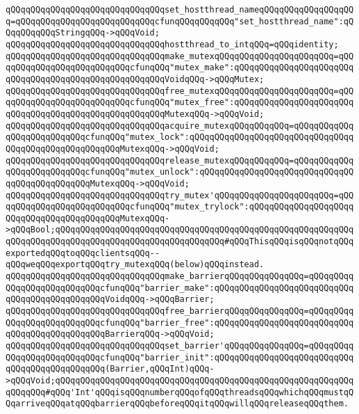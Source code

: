 \verb|qQQqqQQqqQQqqQQqqQQqqQQqqQQqqQQqset_hostthread_nameqQQqqQQqqQQqqQQqqQQq=qQQqqQQqqQQqqQQqqQQqqQQqqQQqcfunqQQqqQQqqQQq"set_hostthread_name":qQQqqQQqqQQqStringqQQq->qQQqVoid;|\newline
\newline
\verb|qQQqqQQqqQQqqQQqqQQqqQQqqQQqqQQqhostthread_to_intqQQq=qQQqidentity;|\newline
\newline
\verb|qQQqqQQqqQQqqQQqqQQqqQQqqQQqqQQqmake_mutexqQQqqQQqqQQqqQQqqQQqqQQq=qQQqqQQqqQQqqQQqqQQqqQQqqQQqcfunqQQq"mutex_make":qQQqqQQqqQQqqQQqqQQqqQQqqQQqqQQqqQQqqQQqqQQqqQQqqQQqqQQqVoidqQQq->qQQqMutex;|\newline
\verb|qQQqqQQqqQQqqQQqqQQqqQQqqQQqqQQqfree_mutexqQQqqQQqqQQqqQQqqQQqqQQq=qQQqqQQqqQQqqQQqqQQqqQQqqQQqcfunqQQq"mutex_free":qQQqqQQqqQQqqQQqqQQqqQQqqQQqqQQqqQQqqQQqqQQqqQQqqQQqqQQqMutexqQQq->qQQqVoid;|\newline
\verb|qQQqqQQqqQQqqQQqqQQqqQQqqQQqqQQqacquire_mutexqQQqqQQqqQQq=qQQqqQQqqQQqqQQqqQQqqQQqqQQqcfunqQQq"mutex_lock":qQQqqQQqqQQqqQQqqQQqqQQqqQQqqQQqqQQqqQQqqQQqqQQqqQQqqQQqMutexqQQq->qQQqVoid;|\newline
\verb|qQQqqQQqqQQqqQQqqQQqqQQqqQQqqQQqrelease_mutexqQQqqQQqqQQq=qQQqqQQqqQQqqQQqqQQqqQQqqQQqcfunqQQq"mutex_unlock":qQQqqQQqqQQqqQQqqQQqqQQqqQQqqQQqqQQqqQQqqQQqqQQqMutexqQQq->qQQqVoid;|\newline
\verb|qQQqqQQqqQQqqQQqqQQqqQQqqQQqqQQqtry_mutex'qQQqqQQqqQQqqQQqqQQqqQQq=qQQqqQQqqQQqqQQqqQQqqQQqqQQqcfunqQQq"mutex_trylock":qQQqqQQqqQQqqQQqqQQqqQQqqQQqqQQqqQQqqQQqqQQqMutexqQQq->qQQqBool;qQQqqQQqqQQqqQQqqQQqqQQqqQQqqQQqqQQqqQQqqQQqqQQqqQQqqQQqqQQqqQQqqQQqqQQqqQQqqQQqqQQqqQQqqQQqqQQqqQQqqQQq#qQQqThisqQQqisqQQqnotqQQqexportedqQQqtoqQQqclientsqQQq--qQQqweqQQqexportqQQqtry_mutexqQQq(below)qQQqinstead.|\newline
\newline
\verb|qQQqqQQqqQQqqQQqqQQqqQQqqQQqqQQqmake_barrierqQQqqQQqqQQqqQQq=qQQqqQQqqQQqqQQqqQQqqQQqqQQqcfunqQQq"barrier_make":qQQqqQQqqQQqqQQqqQQqqQQqqQQqqQQqqQQqqQQqqQQqqQQqVoidqQQq->qQQqBarrier;|\newline
\verb|qQQqqQQqqQQqqQQqqQQqqQQqqQQqqQQqfree_barrierqQQqqQQqqQQqqQQq=qQQqqQQqqQQqqQQqqQQqqQQqqQQqcfunqQQq"barrier_free":qQQqqQQqqQQqqQQqqQQqqQQqqQQqqQQqqQQqqQQqqQQqqQQqBarrierqQQq->qQQqVoid;|\newline
\verb|qQQqqQQqqQQqqQQqqQQqqQQqqQQqqQQqset_barrier'qQQqqQQqqQQqqQQq=qQQqqQQqqQQqqQQqqQQqqQQqqQQqcfunqQQq"barrier_init":qQQqqQQqqQQqqQQqqQQqqQQqqQQqqQQqqQQqqQQqqQQqqQQq(Barrier,qQQqInt)qQQq->qQQqVoid;qQQqqQQqqQQqqQQqqQQqqQQqqQQqqQQqqQQqqQQqqQQqqQQqqQQqqQQqqQQqqQQqqQQq#qQQq'Int'qQQqisqQQqnumberqQQqofqQQqthreadsqQQqwhichqQQqmustqQQqarriveqQQqatqQQqbarrierqQQqbeforeqQQqitqQQqwillqQQqreleaseqQQqthem.|\newline
